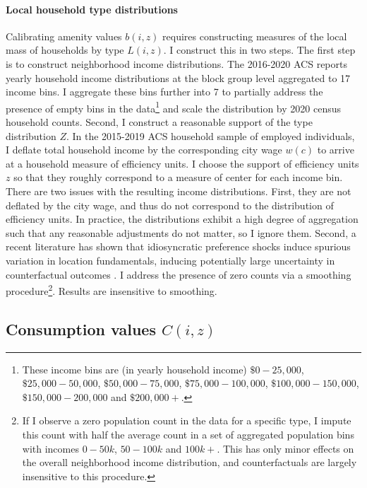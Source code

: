 \documentclass[12pt]{article}
\begin{document}
\paragraph*{Local household type distributions} Calibrating amenity values $b(i, z)$ requires constructing measures of the local mass of households by type $L(i, z)$. I construct this in two steps. The first step is to construct neighborhood income distributions. The 2016-2020 ACS reports yearly household income distributions at the block group level aggregated to 17 income bins. I aggregate these bins further into 7 to partially address the presence of empty bins in the data\footnote{These income bins are (in yearly household income) $\$0-25,000$, $\$25,000-50,000$, $\$50,000-75,000$, $\$75,000-100,000$, $\$100,000-150,000$, $\$150,000-200,000$ and $\$200,000+$.} and scale the distribution by 2020 census household counts. Second, I construct a reasonable support of the type distribution $Z$. In the 2015-2019 ACS household sample of employed individuals, I deflate total household income by the corresponding city wage $w(c)$ to arrive at a household measure of efficiency units. I choose the support of efficiency units $z$ so that they roughly correspond to a measure of center for each income bin. There are two issues with the resulting income distributions. First, they are not deflated by the city wage, and thus do not correspond to the distribution of efficiency units. In practice, the distributions exhibit a high degree of aggregation such that any reasonable adjustments do not matter, so I ignore them. Second, a recent literature has shown that idiosyncratic preference shocks induce spurious variation in location fundamentals, inducing potentially large uncertainty in counterfactual outcomes \citep{DingelTintelnot:2021}. I address the presence of zero counts via a smoothing procedure\footnote{If I observe a zero population count in the data for a specific type, I impute this count with half the average count in a set of aggregated population bins with incomes $0-50k$, $50-100k$ and $100k+$. This has only minor effects on the overall neighborhood income distribution, and counterfactuals are largely insensitive to this procedure.}. Results are insensitive to smoothing.

\subsection{Consumption values $C(i, z)$} 
\end{document}
